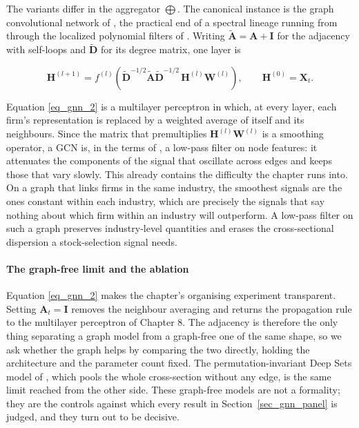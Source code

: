 The variants differ in the aggregator $\bigoplus$. The canonical instance is the graph convolutional network of \cite{kipf2017semisupervised}, the practical end of a spectral lineage running from \cite{bruna2014spectral} through the localized polynomial filters of \cite{defferrard2016convolutional}. Writing $\tilde{\mathbf{A}} = \mathbf{A} + \mathbf{I}$ for the adjacency with self-loops and $\tilde{\mathbf{D}}$ for its degree matrix, one layer is

\begin{equation}
\label{eq_gnn_2}
\mathbf{H}^{(l+1)} = f^{(l)}\!\left( \tilde{\mathbf{D}}^{-1/2}\tilde{\mathbf{A}}\tilde{\mathbf{D}}^{-1/2}\,\mathbf{H}^{(l)}\mathbf{W}^{(l)} \right), \qquad \mathbf{H}^{(0)} = \mathbf{X}_t.
\end{equation}

Equation \ref{eq_gnn_2} is a multilayer perceptron in which, at every layer, each firm's representation is replaced by a weighted average of itself and its neighbours. Since the matrix that premultiplies $\mathbf{H}^{(l)}\mathbf{W}^{(l)}$ is a smoothing operator, a GCN is, in the terms of \cite{nt2019revisiting}, a low-pass filter on node features: it attenuates the components of the signal that oscillate across edges and keeps those that vary slowly. This already contains the difficulty the chapter runs into. On a graph that links firms in the same industry, the smoothest signals are the ones constant within each industry, which are precisely the signals that say nothing about which firm within an industry will outperform. A low-pass filter on such a graph preserves industry-level quantities and erases the cross-sectional dispersion a stock-selection signal needs.

\paragraph{The graph-free limit and the ablation}\label{sec_gnn_ablation}

Equation \ref{eq_gnn_2} makes the chapter's organising experiment transparent. Setting $\mathbf{A}_t = \mathbf{I}$ removes the neighbour averaging and returns the propagation rule to the multilayer perceptron of Chapter 8. The adjacency is therefore the only thing separating a graph model from a graph-free one of the same shape, so we ask whether the graph helps by comparing the two directly, holding the architecture and the parameter count fixed. The permutation-invariant Deep Sets model of \cite{zaheer2017deep}, which pools the whole cross-section without any edge, is the same limit reached from the other side. These graph-free models are not a formality; they are the controls against which every result in Section~\ref{sec_gnn_panel} is judged, and they turn out to be decisive.

